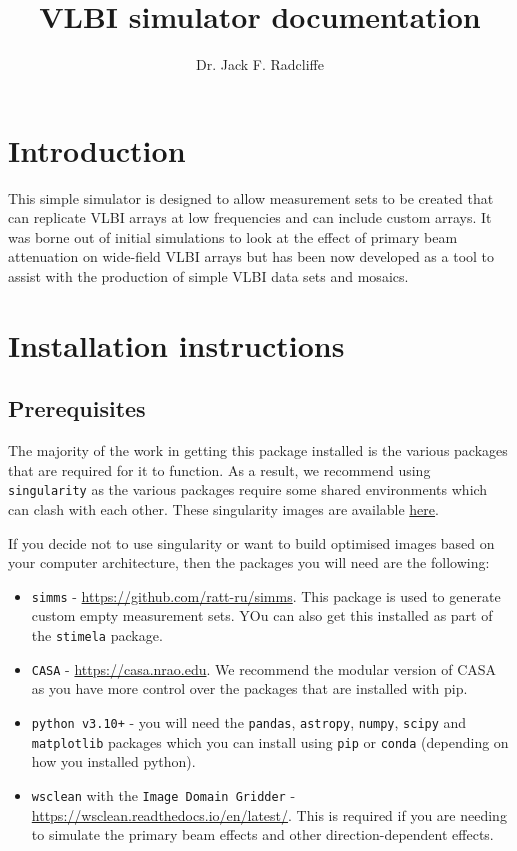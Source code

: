 \documentclass[11pt]{report_jfr}
\title{\fontfamily{lmss}\selectfont VLBI simulator documentation\vspace{-1em}}
\date{\vspace{-3.5em}}
\author{\fontfamily{lmss}\selectfont Dr. Jack F. Radcliffe\vspace{-2em}}
\begin{document}
\maketitle
\thispagestyle{coverstyle}
\selectfont

\section{Introduction}
This simple simulator is designed to allow measurement sets to be created that can replicate VLBI arrays at low frequencies and can include custom arrays. It was borne out of initial simulations to look at the effect of primary beam attenuation on wide-field VLBI arrays but has been now developed as a tool to assist with the production of simple VLBI data sets and mosaics. 

\section{Installation instructions}
\subsection{Prerequisites}
The majority of the work in getting this package installed is the various packages that are required for it to function. As a result, we recommend using \texttt{singularity} as the various packages require some shared environments which can clash with each other. These singularity images are available \href{ss}{here}.

If you decide not to use singularity or want to build optimised images based on your computer architecture, then the packages you will need are the following:
%
\begin{itemize}
	\item \texttt{simms} - \href{https://github.com/ratt-ru/simms}{https://github.com/ratt-ru/simms}. This package is used to generate custom empty measurement sets. YOu can also get this installed as part of the \texttt{stimela} package.
	\item \texttt{CASA} - \href{https://casa.nrao.edu}{https://casa.nrao.edu}. We recommend the modular version of CASA as you have more control over the packages that are installed with pip. 
	\item \texttt{python v3.10+} - you will need the \texttt{pandas}, \texttt{astropy}, \texttt{numpy}, \texttt{scipy} and \texttt{matplotlib} packages which you can install using \texttt{pip} or \texttt{conda} (depending on how you installed python).
	\item \texttt{wsclean} with the \texttt{Image Domain Gridder} - \href{https://wsclean.readthedocs.io/en/latest/}{https://wsclean.readthedocs.io/en/latest/}. This is required if you are needing to simulate the primary beam effects and other direction-dependent effects. 
\end{itemize}
\end{document}
